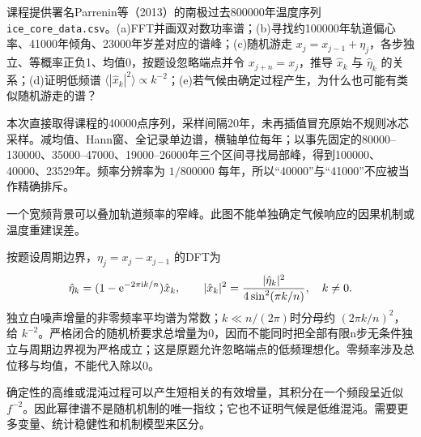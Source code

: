 \begin{exercise}\label{task:chaos-PS5-2}
课程提供署名Parrenin等（2013）的南极过去800000年温度序列 \texttt{ice\_core\_data.csv}。(a)FFT并画双对数功率谱；(b)寻找约100000年轨道偏心率、41000年倾角、23000年岁差对应的谱峰；(c)随机游走 $x_j=x_{j-1}+\eta_j$，各步独立、等概率正负1、均值0，按题设忽略端点并令 $x_{j+n}=x_j$，推导 $\hat x_k$ 与 $\hat\eta_k$ 的关系；(d)证明低频谱 $\langle|\hat x_k|^2\rangle\propto k^{-2}$；(e)若气候由确定过程产生，为什么也可能有类似随机游走的谱？
\end{exercise}
\begin{solution}
本次直接取得课程的40000点序列，采样间隔20年，未再插值冒充原始不规则冰芯采样。减均值、Hann窗、全记录单边谱，横轴单位每年；以事先固定的80000--130000、35000--47000、19000--26000年三个区间寻找局部峰，得到100000、40000、23529年。频率分辨率为 $1/800000$ 每年，所以“40000”与“41000”不应被当作精确排斥。
\begin{center}\end{center}
一个宽频背景可以叠加轨道频率的窄峰。此图不能单独确定气候响应的因果机制或温度重建误差。

按题设周期边界，$\eta_j=x_j-x_{j-1}$ 的DFT为
\[
 \hat\eta_k=(1-\mathrm e^{-2\pi\mathrm ik/n})\hat x_k,\qquad
 |\hat x_k|^2=\frac{|\hat\eta_k|^2}{4\sin^2(\pi k/n)},\quad k\ne0.
\]
独立白噪声增量的非零频率平均谱为常数；$k\ll n/(2\pi)$时分母约 $(2\pi k/n)^2$，给 $k^{-2}$。严格闭合的随机桥要求总增量为0，因而不能同时把全部有限n步无条件独立与周期边界视为严格成立；这是原题允许忽略端点的低频理想化。零频率涉及总位移与均值，不能代入除以0。

确定性的高维或混沌过程可以产生短相关的有效增量，其积分在一个频段呈近似 $f^{-2}$。因此幂律谱不是随机机制的唯一指纹；它也不证明气候是低维混沌。需要更多变量、统计稳健性和机制模型来区分。
\end{solution}

